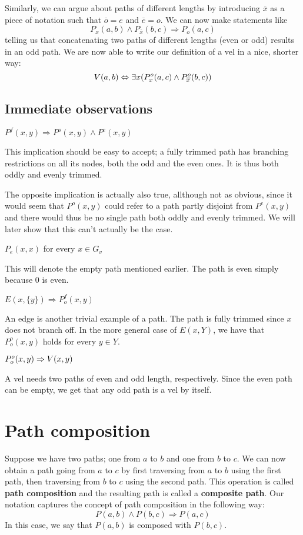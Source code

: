 Similarly, we can argue about paths of different lengths by introducing $\overline{x}$ as a piece of notation such that $\overline{o} = e$ and $\overline{e} = o$.
We can now make statements like \[P_x(a,b) \wedge P_{\overline{x}}(b,c) \Rightarrow P_o(a,c)\] telling us that concatenating two paths of different lengths (even or odd) results in an odd path.
We are now able to write our definition of a vel in a nice, shorter way:
\[
V(a,b) \Leftrightarrow \exists x(P^o_x(a,c) \wedge P^o_{\overline{x}}(b,c))
\]
\subsection{Immediate observations}
\label{sub:Immediate observations}
\begin{lemma}
  $P^f(x,y) \Rightarrow P^o(x,y) \wedge P^e(x,y)$
\end{lemma}
 This implication should be easy to accept; a fully trimmed path has branching restrictions on all its nodes, both the odd and the even ones.
 It is thus both oddly and evenly trimmed.

 The opposite implication is actually also true, allthough not as obvious, since it would seem that $P^o(x,y)$ could refer to a path partly disjoint from $P^e(x,y)$ and there would thus be no single path both oddly and evenly trimmed.
 We will later show that this can't actually be the case.
\begin{lemma}
  $P_e(x,x)$ for every $x \in G_v$
\end{lemma}
This will denote the empty path mentioned earlier.
The path is even simply because 0 is even.
\begin{lemma}
  $E(x,\{ y \}) \Rightarrow P^f_o(x,y)$
\end{lemma}
An edge is another trivial example of a path.
The path is fully trimmed since $x$ does not branch off.
In the more general case of $E(x,Y)$, we have that $P^o_o(x,y)$ holds for every $y \in Y$.
\begin{lemma}
  $P^o_o(x,y) \Rightarrow V(x,y)$
\end{lemma}
A vel needs two paths of even and odd length, respectively.
Since the even path can be empty, we get that any odd path is a vel by itself.
\section{Path composition}
\label{sec:Path composition}
Suppose we have two paths; one from $a$ to $b$ and one from $b$ to $c$.
We can now obtain a path going from $a$ to $c$ by first traversing from $a$ to $b$ using the first path, then traversing from $b$ to $c$ using the second path.
This operation is called \textbf{path composition} and the resulting path is called a \textbf{composite path}.
Our notation captures the concept of path composition in the following way:
\[
P(a,b) \wedge P(b,c) \Rightarrow P(a,c)
\]
In this case, we say that $P(a,b)$ is composed with $P(b,c)$.

